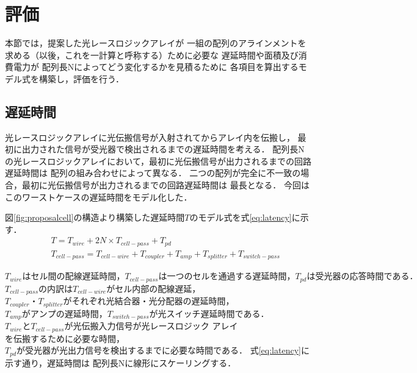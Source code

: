 \section{評価}
本節では，提案した光レースロジックアレイが
一組の配列のアラインメントを求める（以後，これを一計算と呼称する）ために必要な
遅延時間や面積及び消費電力が
配列長Nによってどう変化するかを見積るために
各項目を算出するモデル式を構築し，評価を行う．

\subsection{遅延時間}
光レースロジックアレイに光伝搬信号が入射されてからアレイ内を伝搬し，
最初に出力された信号が受光器で検出されるまでの遅延時間を考える．
配列長Nの光レースロジックアレイにおいて，最初に光伝搬信号が出力されるまでの回路遅延時間は
配列の組み合わせによって異なる．
二つの配列が完全に不一致の場合，最初に光伝搬信号が出力されるまでの回路遅延時間は
最長となる．
今回はこのワーストケースの遅延時間をモデル化した．

図\ref{fig:proposalcell}の構造より構築した遅延時間$T$のモデル式を式\ref{eq:latency}に示す．
\begin{eqnarray}
&&T = T_{wire}+2N \times T_{cell-pass}+T_{pd} \nonumber \\
&&T_{cell-pass} = T_{cell-wire}+T_{coupler}+T_{amp}+T_{splitter}+T_{switch-pass}
\label{eq:latency}
\end{eqnarray}

$T_{wire}はセル間の配線遅延時間，T_{cell-pass}は一つのセルを通過する遅延時間，T_{pd}は受光器の応答時間である．$
$T_{cell-pass}の内訳はT_{cell-wire}がセル内部の配線遅延，$
$T_{coupler}・T_{splitter}がそれぞれ光結合器・光分配器の遅延時間，$
$T_{amp}がアンプの遅延時間，T_{switch-pass}が光スイッチ遅延時間である．$
$T_{wire}とT_{cell-pass}が光伝搬入力信号が$光レースロジック アレイ$を伝搬するために必要な時間，$
$T_{pd}が受光器が光出力信号を検出するまでに必要な時間である．$
式\ref{eq:latency}に示す通り，遅延時間は
配列長Nに線形にスケーリングする．

